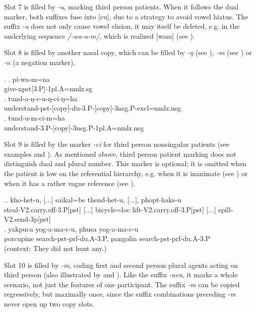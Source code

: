 Slot 7 is filled by  \emph{-u}, marking third person patients. When it follows the dual marker, both suffixes fuse into [cu], due to a strategy to avoid vowel hiatus. The suffix \emph{-u} does not only cause vowel elision, it may itself be deleted, e.g. in the underlying sequence \emph{/-wa-u-m/}, which is realized [wam] (see \Next[a]). 

Slot 8 is filled by another nasal copy, which can be filled by \emph{-ŋ} (see \Next[b]), \emph{-m} (see \Next[c]) or \emph{-n} (a negation marker).

\ex. \ag. pi-wa-m=na\\
	give{\sc -npst[3.P]-1pl.A=nmlz.sg}\\
	\bg.	tund-a-ŋ-c-u-ŋ-ci-ŋ=ha\\
	understand{\sc -pst-[copy]-du-3.P-[copy]-3nsg.P-excl=nmlz.nsg}\\
	\bg.	tund-u-m-ci-m=ha\\
	understand{\sc [pst]-3.P-[copy]-3nsg.P-1pl.A=nmlz.nsg}\\

	
Slot 9  is filled by the marker \emph{-ci} for third person nonsingular patients (see examples \Last[b] and \Last[c]). As mentioned above, third person  patient marking does not distinguish dual and plural number. This marker is optional; it is omitted when the patient is low on the referential hierarchy, e.g. when it is inanimate (see \Next[a]) or when it has a rather vague reference (see \Next[b]). 



\ex.\ag. kho-het-u, [...] saikal=be thend-het-u, [...],  phopt-haks-u      \\
steal{\sc -V2.carry.off-3.P[pst]}  [...] bicycle{\sc =loc} lift{\sc -V2.carry.off-3.P[pst]} [...] spill{\sc -V2.send-3p[pst]}\\
  
\bg. yakpuca   yog-a-ma-c-u, phusa    yog-a-ma-c-u\\
porcupine   search{\sc -pst-prf-du.A-3.P}, pangolin   search{\sc -pst-prf-du.A-3.P}\\
 (context: They did not hunt any.) 
	
	Slot  10 is filled by \emph{-m}, coding first and second person plural agents  acting on third person (also illustrated by \LLast[a] and \LLast[c]). Like the suffix \emph{-nen}, it marks a whole scenario, not just the features of one participant. The suffix \emph{-m} can be copied regressively, but maximally once, since the suffix combinations preceding \emph{-m} never open up two copy slots.
	
